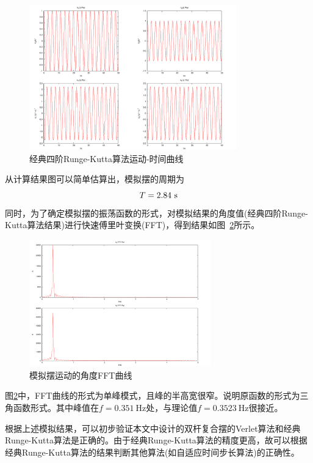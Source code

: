 \documentclass[a4paper,12pt,titlepage]{article}
\begin{document}
\begin{figure}[H]
\centering
\includegraphics[width=0.8\textwidth]{./RKmove_1.pdf}
\caption[Caption for LOF]{经典四阶Runge-Kutta算法运动-时间曲线}
\label{fig:RKmove_1}
\end{figure}
从计算结果图可以简单估算出，模拟摆的周期为
\begin{equation}
	T=2.84~\mathrm{s} \notag
\end{equation}
同时，为了确定模拟摆的振荡函数的形式，对模拟结果的角度值(经典四阶Runge-Kutta算法结果)进行快速傅里叶变换(FFT)，得到结果如图~\ref{fig:RKFFT_1}所示。
\begin{figure}[H]
\centering
\includegraphics[width=0.7\textwidth]{./RKFFT_1.pdf}
\caption[Caption for LOF]{模拟摆运动的角度FFT曲线}
\label{fig:RKFFT_1}
\end{figure}
图\ref{fig:RKFFT_1}中，FFT曲线的形式为单峰模式，且峰的半高宽很窄。说明原函数的形式为三角函数形式。其中峰值在$f=0.351~\mathrm{Hz}$处，与理论值$f=0.3523~\mathrm{Hz}$很接近。

根据上述模拟结果，可以初步验证本文中设计的双杆复合摆的Verlet算法和经典Runge-Kutta算法是正确的。由于经典Runge-Kutta算法的精度更高，故可以根据经典Runge-Kutta算法的结果判断其他算法(如自适应时间步长算法)的正确性。
\end{document}
